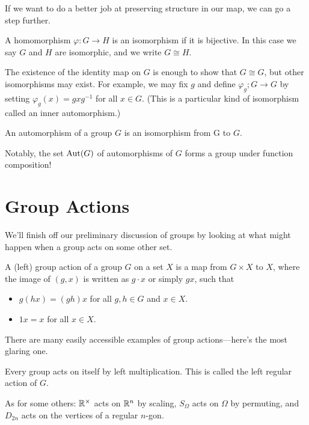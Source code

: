 \documentclass[../m171main.tex]{subfiles}
\begin{document}
If we want to do a better job at preserving structure in our map, we can go a step further.

\begin{definition}[Isomorphism]
    A homomorphism $\varphi : G \to H$ is an isomorphism if it is bijective.
    In this case we say $G$ and $H$ are isomorphic, and we write $G \cong H$.
\end{definition}

The existence of the identity map on $G$ is enough to show that $G \cong G$, but other isomorphisms may exist.
For example, we may fix $g$ and define $\varphi_g ; G \to G$ by setting $\varphi_g(x) = g x g^{-1}$ for all $x \in G$.
(This is a particular kind of isomorphism called an inner automorphism.)

\begin{definition}[Automorphism]
    An automorphism of a group $G$ is an isomorphism from G to $G$.
\end{definition}

Notably, the set $\textrm{Aut}(G)$ of automorphisms of $G$ forms a group under function composition!

\section{Group Actions}
We'll finish off our preliminary discussion of groups by looking at what might happen when a group acts on some other set.

\begin{definition}
    A (left) group action of a group $G$ on a set $X$ is a map from $G \times X$ to $X$, where the image of $(g,x)$ is written as $g \cdot x$ or simply $gx$, such that
    \begin{itemize}
        \item $g(hx) = (gh)x$ for all $g,h \in G$ and $x \in X$.
        \item $1x = x$ for all $x \in X$.
    \end{itemize}
\end{definition}

There are many easily accessible examples of group actions---here's the most glaring one.

\begin{definition}
    Every group acts on itself by left multiplication.
    This is called the left regular action of $G$.
\end{definition}

As for some others: $\mathbb{R}^\times$ acts on $\mathbb{R}^n$ by scaling, $S_\Omega$ acts on $\Omega$ by permuting, and $D_{2n}$ acts on the vertices of a regular $n$-gon.
\end{document}
